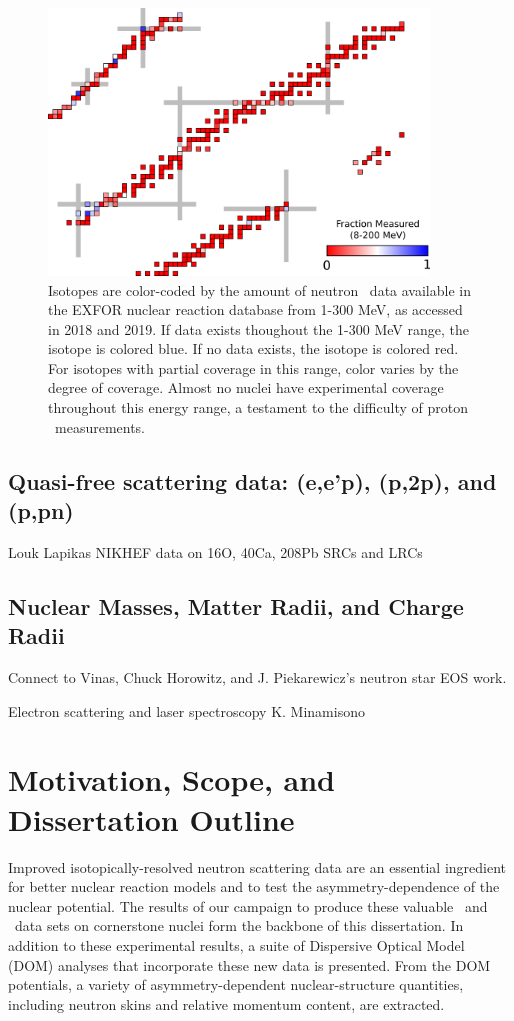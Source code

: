 \begin{figure}
    \centering
    \includegraphics[width=0.9\textwidth]{figures/RCSChart.png}
    \caption[Landscape of existing proton \rxn\ data in 2019]
    {Isotopes are color-coded by the amount of neutron \tot\ data available in the EXFOR nuclear
        reaction database from 1-300 MeV, as accessed in 2018 and 2019. If data exists thoughout the 1-300 MeV range, the isotope
        is colored blue. If no data exists, the isotope is colored red. For
        isotopes with partial coverage in this range, color varies by the degree
        of coverage. Almost no nuclei have experimental coverage throughout this energy
        range, a testament to the difficulty of proton \rxn\ measurements.}
    \label{RCSChart}
\end{figure}

\subsection{Quasi-free scattering data: (e,e'p), (p,2p), and (p,pn)}
Louk Lapikas
NIKHEF data on 16O, 40Ca, 208Pb
SRCs and LRCs

\subsection{Nuclear Masses, Matter Radii, and Charge Radii}
Connect to Vinas, Chuck Horowitz, and J. Piekarewicz's neutron star EOS work.

Electron scattering and laser spectroscopy
K. Minamisono

\section{Motivation, Scope, and Dissertation Outline}
Improved isotopically-resolved neutron scattering data are an essential ingredient
for better nuclear reaction models and to test the asymmetry-dependence of the
nuclear potential. The results of our campaign to produce these valuable
\tot\ and \el\ data sets on cornerstone nuclei form the backbone of this dissertation.
In addition to these experimental results, a suite of Dispersive Optical Model (DOM) analyses that 
incorporate these new data is presented. From the DOM potentials, a variety of asymmetry-dependent 
nuclear-structure quantities, including neutron skins and relative momentum
content, are extracted.

